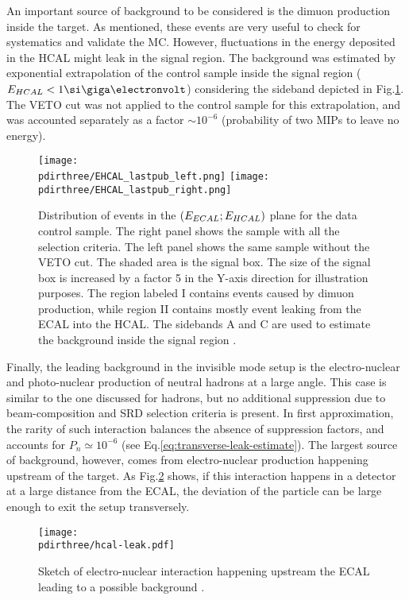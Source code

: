 An important source of background to be considered is the dimuon production inside the target. As mentioned, these events are very useful to check for systematics and validate the MC. However, fluctuations in the energy deposited in the HCAL might leak in the signal region. The background was estimated by exponential extrapolation of the control sample inside the signal region ($E_{HCAL} < 1 \gev$) considering the sideband depicted in Fig.\ref{fig:ehcal-bkg-bands}. The VETO cut was not applied to the control sample for this extrapolation, and was accounted separately as a factor $\sim 10^{-6}$ (probability of two MIPs to leave no energy).

\begin{figure}[bth!]
  \centering
  \texttt{[image: \\pdirthree/EHCAL\_lastpub\_left.png]}
  \texttt{[image: \\pdirthree/EHCAL\_lastpub\_right.png]}
  \caption[ECAL vs HCAL events band]{Distribution of events in the $(E_{ECAL};E_{HCAL})$ plane for the data control sample. The right panel shows the sample with all the selection criteria. The left panel shows the same sample without the VETO cut. The shaded area is the signal box. The size of the signal box is increased by a factor 5 in the Y-axis direction for illustration purposes. The region labeled I contains events caused by dimuon production, while region II contains mostly event leaking from the ECAL into the HCAL. The sidebands A and C are used to estimate the background inside the signal region \cite{NA64:2019imj}.}
  \label{fig:ehcal-bkg-bands}
\end{figure}

Finally, the leading background in the invisible mode setup is the electro-nuclear and photo-nuclear production of neutral hadrons at a large angle. This case is similar to the one discussed for hadrons, but no additional suppression due to beam-composition and SRD selection criteria is present. In first approximation, the rarity of such interaction balances the absence of suppression factors, and accounts for $P_n \simeq 10^{-6}$ (see Eq.\ref{eq:transverse-leak-estimate}).
The largest source of background, however, comes from electro-nuclear production happening upstream of the target. As Fig.\ref{fig:eh-prod-sketch} shows, if this interaction happens in a detector at a large distance from the ECAL, the deviation of the particle can be large enough to exit the setup transversely. 


\begin{figure}[bth!]
  \centering
  \texttt{[image: \\pdirthree/hcal-leak.pdf]}
  \caption[upstream electro-hadron production upstream]{Sketch of electro-nuclear interaction happening upstream the ECAL leading to a possible background \cite{pdegen-thesis}.}
  \label{fig:eh-prod-sketch}
\end{figure}

